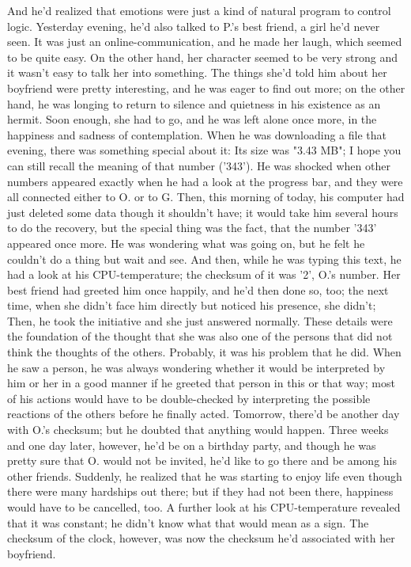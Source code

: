 And he'd realized that emotions were just a kind of natural program to control logic. 
Yesterday evening, he'd also talked to P.'s best friend, a girl he'd never seen. It was just an online-communication, and he made her laugh, which seemed to be quite easy. On the other hand, her character seemed to be very strong and it wasn't easy to talk her into something. 
The things she'd told him about her boyfriend were pretty interesting, and he was eager to find out more; on the other hand, he was longing to return to silence and quietness in his existence as an hermit. 
Soon enough, she had to go, and he was left alone once more, in the happiness and sadness of contemplation. When he was downloading a file that evening, there was something special about it: Its size was "3.43 MB"; I hope you can still recall the meaning of that number ('343'). He was shocked when other numbers appeared exactly when he had a look at the progress bar, and they were all connected either to O. or to G. 
Then, this morning of today, his computer had just deleted some data though it shouldn't have; it would take him several hours to do the recovery, but the special thing was the fact, that the number '343' appeared once more. 
He was wondering what was going on, but he felt he couldn't do a thing but wait and see. 
And then, while he was typing this text, he had a look at his CPU-temperature; the checksum of it was '2', O.'s number. 
Her best friend had greeted him once happily, and he'd then done so, too; the next time, when she didn't face him directly but noticed his presence, she didn't; Then, he took the initiative and she just answered normally. These details were the foundation of the thought that she was also one of the persons that did not think the thoughts of the others. 
Probably, it was his problem that he did. 
When he saw a person, he was always wondering whether it would be interpreted by him or her in a good manner if he greeted that person in this or that way; most of his actions would have to be double-checked by interpreting the possible reactions of the others before he finally acted. 
Tomorrow, there'd be another day with O.'s checksum; but he doubted that anything would happen. Three weeks and one day later, however, he'd be on a birthday party, and though he was pretty sure that O. would not be invited, he'd like to go there and be among his other friends. 
Suddenly, he realized that he was starting to enjoy life even though there were many hardships out there; but if they had not been there, happiness would have to be cancelled, too. A further look at his CPU-temperature revealed that it was constant; he didn't know what that would mean as a sign. The checksum of the clock, however, was now the checksum he'd associated with her boyfriend. 
